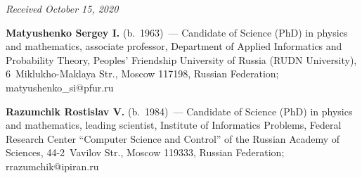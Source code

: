 \vspace*{-6pt}

\hfill{\small\textit{Received October 15, 2020}}


\vspace*{-20pt}


\Contr

\vspace*{-4pt}

\noindent
\textbf{Matyushenko Sergey I.} (b.\ 1963)~---
Candidate of Science (PhD) in physics and mathematics, associate 
professor,
Department of Applied Informatics and Probability Theory,
Peoples' Friendship University of Russia (RUDN University), 
6~Miklukho-Maklaya Str., Moscow 117198, Russian Federation; 
\mbox{matyushenko\_si@pfur.ru}

\vspace*{3pt}

\noindent
\textbf{Razumchik Rostislav V.} (b.\ 1984)~---
Candidate of Science (PhD) in physics and mathematics, leading scientist,
Institute of Informatics Problems, Federal Research Center ``Computer 
Science and Control'' of the Russian Academy of Sciences, 44-2~Vavilov 
Str., Moscow 119333, Russian Federation; \mbox{rrazumchik@ipiran.ru}

\label{end\stat}

\renewcommand{\bibname}{\protect\rm Литература} 